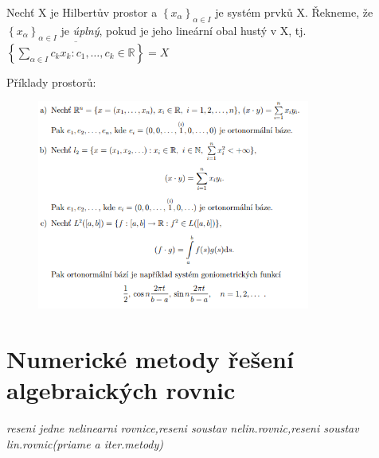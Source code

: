 \begin{definition}
Nechť X je Hilbertův prostor a $ \left\lbrace x_{\alpha} \right\rbrace_{\alpha \in I} $ je systém prvků X. Řekneme, že $ \left\lbrace x_{\alpha} \right\rbrace_{\alpha \in I} $ je \textit{úplný}, pokud je jeho lineární obal hustý v X, tj. $ \overline{\left\lbrace \sum_{\alpha \in I} c_k x_k: c_1,\ldots,c_k \in \mathbb{R} \right\rbrace} =X $
\end{definition}






Příklady prostorů:
\begin{figure}[h!]
\includegraphics[width=0.8\textwidth]{Obrazky/priklady_prostoru}
\end{figure}


\section{Numerické metody řešení algebraických rovnic}  
\textit{reseni jedne nelinearni rovnice,reseni soustav nelin.rovnic,reseni soustav lin.rovnic(priame a iter.metody)}

